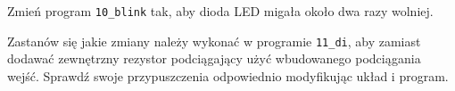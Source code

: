 % 
% 
% 
% 


\dbEntryCheckResults
  Zmień program \Verb$10_blink$ tak, aby dioda LED migała około dwa razy wolniej.
\fi

\dbEntryCheckResults
  Zastanów się jakie zmiany należy wykonać w programie \Verb$11_di$, aby zamiast dodawać zewnętrzny rezystor podciągający użyć wbudowanego podciągania wejść.
  Sprawdź swoje przypuszczenia odpowiednio modyfikując układ i program.
\fi


